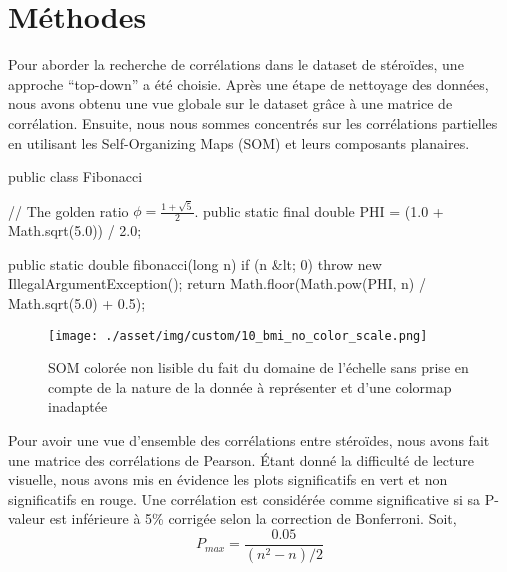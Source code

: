 \chapter{Méthodes}
    

    Pour aborder la recherche de corrélations dans le dataset de stéroïdes, une approche ``top-down'' a été choisie. Après une étape de nettoyage des données, nous avons obtenu une vue globale sur le dataset grâce à une matrice de corrélation. Ensuite, nous nous sommes concentrés sur les corrélations partielles en utilisant les Self-Organizing Maps (SOM) et leurs composants planaires. 


    \begin{javacode}
        public class Fibonacci {

          // The golden ratio $\phi = \frac{1 + \sqrt{5}}{2}$.
          public static final double PHI = (1.0 + Math.sqrt(5.0)) / 2.0;

          public static double fibonacci(long n) {
            if (n &lt; 0) throw new IllegalArgumentException();
            return Math.floor(Math.pow(PHI, n) / Math.sqrt(5.0) + 0.5);
          }

        }
    \end{javacode}

    \begin{figure}[H]
        \centering
        \texttt{[image: ./asset/img/custom/10\_bmi\_no\_color\_scale.png]}    
        \caption{SOM colorée non lisible du fait du domaine de l'échelle sans prise en compte de la nature de la donnée à représenter et d'une colormap inadaptée}
        \label{fig:unreadableColoredSom}
    \end{figure}

    Pour avoir une vue d'ensemble des corrélations entre stéroïdes, nous avons fait une matrice des corrélations de Pearson. Étant donné la difficulté de lecture visuelle, nous avons mis en évidence les plots significatifs en vert et non significatifs en rouge. Une corrélation est considérée comme significative si sa P-valeur est inférieure à 5\% corrigée selon la correction de Bonferroni. \cite{Dunn:1959}\cite{Dunn:1961} Soit, $$P_{max} = \frac{0.05}{(n^2-n)/2}$$


